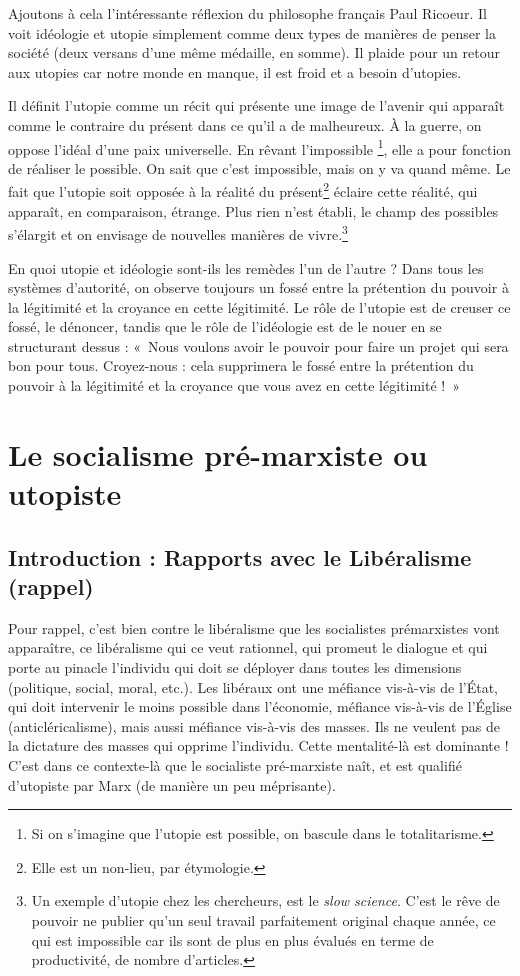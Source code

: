\documentclass[12pt]{report}
\begin{document}
Ajoutons à cela l'intéressante réflexion du philosophe français Paul Ricoeur. Il voit idéologie et utopie simplement comme deux types de manières de penser la société (deux versans d'une même médaille, en somme). Il plaide pour un retour aux utopies car notre monde en manque, il est froid et a besoin d'utopies.

Il définit l'utopie comme un récit qui présente une image de l'avenir qui apparaît comme le contraire du présent dans ce qu'il a de malheureux. À la guerre, on oppose l'idéal d'une paix universelle. En rêvant l'impossible \footnote{Si on s'imagine que l'utopie est possible, on bascule dans le totalitarisme.}, elle a pour fonction de réaliser le possible. On sait que c'est impossible, mais on y va quand même.
Le fait que l'utopie soit opposée à la réalité du présent\footnote{Elle est un non-lieu, par étymologie.} éclaire cette réalité, qui apparaît, en comparaison, étrange. Plus rien n'est établi, le champ des possibles s'élargit et on envisage de nouvelles manières de vivre.\footnote{Un exemple d'utopie chez les chercheurs, est le \emph{slow science}. C'est le rêve de pouvoir ne publier qu'un seul travail parfaitement original chaque année, ce qui est impossible car ils sont de plus en plus évalués en terme de productivité, de nombre d'articles.}

En quoi utopie et idéologie sont-ils les remèdes l'un de l'autre ?
Dans tous les systèmes d'autorité, on observe toujours un fossé entre la prétention du pouvoir à la légitimité et la croyance en cette légitimité. Le rôle de l'utopie est de creuser ce fossé, le dénoncer, tandis que le rôle de l'idéologie est de le nouer en se structurant dessus : «~Nous voulons avoir le pouvoir pour faire un projet qui sera bon pour tous. Croyez-nous : cela supprimera le fossé entre la prétention du pouvoir à la légitimité et la croyance que vous avez en cette légitimité !~»



\section{Le socialisme pré-marxiste ou utopiste}

\subsection*{Introduction : Rapports avec le Libéralisme (rappel)}

Pour rappel, c'est bien contre le libéralisme que les socialistes prémarxistes vont apparaître, ce libéralisme qui ce veut rationnel, qui promeut le dialogue et qui porte au pinacle l'individu qui doit se déployer dans toutes les dimensions (politique, social, moral, etc.). Les libéraux ont une méfiance vis-à-vis de l'État, qui doit intervenir le moins possible dans l'économie, méfiance vis-à-vis de l'Église (anticléricalisme), mais aussi méfiance vis-à-vis des masses. Ils ne veulent pas de la dictature des masses qui opprime l'individu. Cette mentalité-là est dominante ! C'est dans ce contexte-là que le socialiste pré-marxiste naît, et est qualifié d'utopiste par Marx (de manière un peu méprisante).
\end{document}
